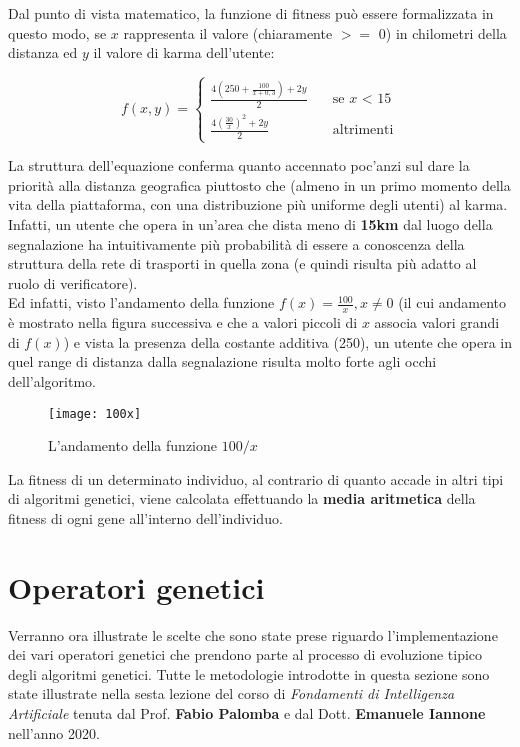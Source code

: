     Dal punto di vista matematico, la funzione di fitness può essere formalizzata in questo modo, se $x$ rappresenta il valore (chiaramente $>=$ 0) in chilometri della distanza ed $y$ il valore di karma dell'utente:

    \[ f(x, y) =
  \begin{cases}
    \frac{4(250 + \frac{100}{x+0,3}) + 2y}{2}      & \quad \text{se } x \text{ < 15}\\
    \frac{4(\frac{30}{x})^2 + 2y}{2}  & \quad \text{altrimenti}
  \end{cases}
\]

\newpage
La struttura dell'equazione conferma quanto accennato poc'anzi sul dare la priorità alla distanza geografica piuttosto che (almeno in un primo momento della vita della piattaforma, con una distribuzione più uniforme degli utenti) al karma. Infatti, un utente che opera in un'area che dista meno di \textbf{15km} dal luogo della segnalazione ha intuitivamente più probabilità di essere a conoscenza della struttura della rete di trasporti in quella zona (e quindi risulta più adatto al ruolo di verificatore). \\
Ed infatti, visto l'andamento della funzione $f(x) = \frac{100}{x}, x \neq 0$ (il cui andamento è mostrato nella figura successiva e che a valori piccoli di $x$ associa valori grandi di $f(x)$) e vista la presenza della costante additiva (250), un utente che opera in quel range di distanza dalla segnalazione risulta molto forte agli occhi dell'algoritmo.
\begin{figure}[h!]
    \begin{center}
        \texttt{[image: 100x]}
    \end{center}
    \caption{L'andamento della funzione $100/x$}
    \label{fig: L'andamento della funzione $100/x$}
\end{figure}

La fitness di un determinato individuo, al contrario di quanto accade in altri tipi di algoritmi genetici, viene calcolata effettuando la \textbf{media aritmetica} della fitness di ogni gene all'interno dell'individuo. 
\newpage
\section{Operatori genetici}
  Verranno ora illustrate le scelte che sono state prese riguardo l'implementazione dei vari operatori genetici che prendono parte al processo di evoluzione tipico degli algoritmi genetici. Tutte le metodologie introdotte in questa sezione sono state illustrate nella sesta lezione del corso di \textit{Fondamenti di Intelligenza Artificiale} tenuta dal Prof. \textbf{Fabio Palomba} e dal Dott. \textbf{Emanuele Iannone} nell'anno 2020.

